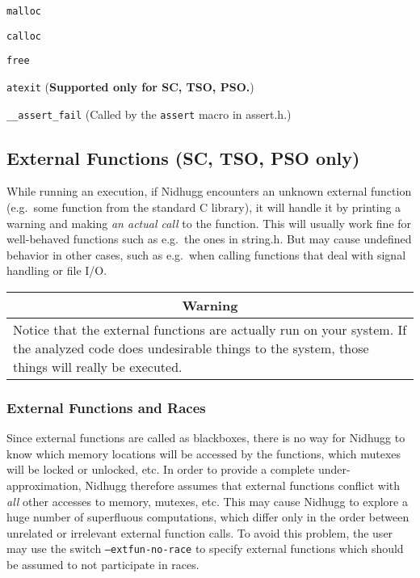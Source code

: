 \documentclass[a4paper]{article}
\newcommand{\limitsupport}[1]{\textbf{Supported only for #1.}}
\begin{document}
\begin{description}
\item{\texttt{malloc}}
\item{\texttt{calloc}}
\item{\texttt{free}}
\item{\texttt{atexit}} (\limitsupport{SC, TSO, PSO})
\item{\texttt{\_\_assert\_fail}} (Called by the \texttt{assert} macro
  in \textsf{assert.h}.)
\end{description}

\subsection{External Functions (SC, TSO, PSO only)}\label{sec:external:functions}

While running an execution, if Nidhugg encounters an unknown external
function (e.g.\ some function from the standard C library), it will
handle it by printing a warning and making \emph{an actual call} to
the function. This will usually work fine for well-behaved functions
such as e.g.\ the ones in \textsf{string.h}. But may cause undefined
behavior in other cases, such as e.g.\ when calling functions that deal
with signal handling or file I/O.

\begin{center}
  \begin{tabular}{|p{.8\linewidth}|}
    \hline
    \multicolumn{1}{|c|}{\textbf{Warning}}\\
    \hline
    Notice that the external functions are actually run on your system. If
    the analyzed code does undesirable things to the system, those things
    will really be executed.\\
    \hline
  \end{tabular}
\end{center}

\subsubsection{External Functions and Races}\label{sec:stdlibc:races}

Since external functions are called as blackboxes, there is no way for
Nidhugg to know which memory locations will be accessed by the
functions, which mutexes will be locked or unlocked, etc. In order to
provide a complete under-approximation, Nidhugg therefore assumes that
external functions conflict with \emph{all} other accesses to memory,
mutexes, etc.
%
This may cause Nidhugg to explore a huge number of superfluous
computations, which differ only in the order between unrelated or
irrelevant external function calls.
%
To avoid this problem, the user may use the switch
\texttt{--extfun-no-race} to specify external functions which should
be assumed to not participate in races.
\end{document}

